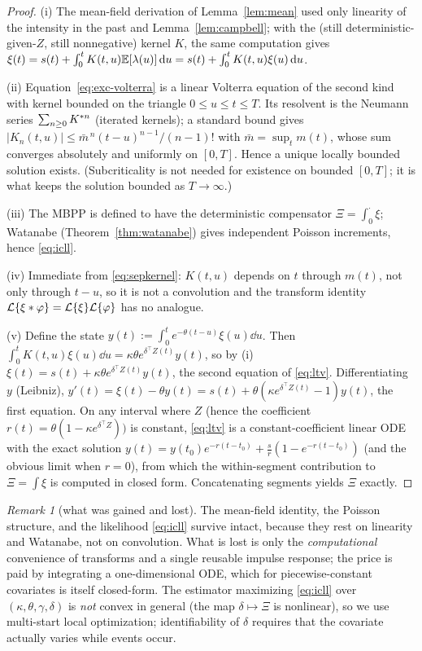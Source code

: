 \documentclass[11pt]{article}
\theoremstyle{plain}
\theoremstyle{definition}
\theoremstyle{remark}
\newtheorem*{remark}{Remark}
\newcommand{\Lap}{\mathcal{L}}
\begin{document}
\begin{proof}
(i) The mean-field derivation of Lemma~\ref{lem:mean} used only linearity of the
intensity in the past and Lemma~\ref{lem:campbell}; with the (still
deterministic-given-$Z$, still nonnegative) kernel $K$, the same computation gives
$\xi(t)=s(t)+\int_0^t K(t,u)\mathbb{E}[\lambda(u)]\,\mathrm{d} u=s(t)+\int_0^t K(t,u)\xi(u)\,\mathrm{d} u$.

(ii) Equation~\eqref{eq:exc-volterra} is a linear Volterra equation of the second
kind with kernel bounded on the triangle $0\le u\le t\le T$. Its resolvent is the
Neumann series $\sum_{n\ge0}K^{\ast n}$ (iterated kernels); a standard bound gives
$|K_n(t,u)|\le \bar m^{\,n}(t-u)^{n-1}/(n-1)!$ with $\bar m=\sup_t m(t)$, whose sum
converges absolutely and uniformly on $[0,T]$. Hence a unique locally bounded
solution exists. (Subcriticality is not needed for existence on bounded $[0,T]$;
it is what keeps the solution bounded as $T\to\infty$.)

(iii) The MBPP is defined to have the deterministic compensator
$\Xi=\int_0^\cdot\xi$; Watanabe (Theorem~\ref{thm:watanabe}) gives independent
Poisson increments, hence \eqref{eq:icll}.

(iv) Immediate from \eqref{eq:sepkernel}: $K(t,u)$ depends on $t$ through $m(t)$,
not only through $t-u$, so it is not a convolution and the transform identity
$\Lap\{\xi\conv\varphi\}=\Lap\{\xi\}\Lap\{\varphi\}$ has no analogue.

(v) Define the state $y(t):=\int_0^t e^{-\theta(t-u)}\xi(u)\dd u$. Then
$\int_0^t K(t,u)\xi(u)\dd u=\kappa\theta e^{\delta^\top Z(t)}y(t)$, so by (i)
$\xi(t)=s(t)+\kappa\theta e^{\delta^\top Z(t)}y(t)$, the second equation of
\eqref{eq:ltv}. Differentiating $y$ (Leibniz),
$y'(t)=\xi(t)-\theta y(t)=s(t)+\theta(\kappa e^{\delta^\top Z(t)}-1)y(t)$, the
first equation. On any interval where $Z$ (hence the coefficient
$r(t)=\theta(1-\kappa e^{\delta^\top Z}))$ is constant, \eqref{eq:ltv} is a
constant-coefficient linear ODE with the exact solution
$y(t)=y(t_0)e^{-r(t-t_0)}+\tfrac{s}{r}(1-e^{-r(t-t_0)})$ (and the obvious limit
when $r=0$), from which the within-segment contribution to $\Xi=\int\xi$ is
computed in closed form. Concatenating segments yields $\Xi$ exactly.
\end{proof}

\begin{remark}[what was gained and lost]
The mean-field identity, the Poisson structure, and the likelihood \eqref{eq:icll}
survive intact, because they rest on linearity and Watanabe, not on convolution.
What is lost is only the \emph{computational} convenience of transforms and a
single reusable impulse response; the price is paid by integrating a
one-dimensional ODE, which for piecewise-constant covariates is itself closed-form.
The estimator maximizing \eqref{eq:icll} over $(\kappa,\theta,\gamma,\delta)$ is
\emph{not} convex in general (the map $\delta\mapsto\Xi$ is nonlinear), so we use
multi-start local optimization; identifiability of $\delta$ requires that the
covariate actually varies while events occur.
\end{remark}
\end{document}

